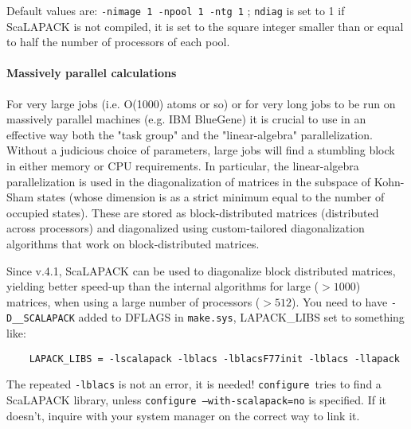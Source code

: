 \documentclass[12pt,a4paper]{article}
\def\configure{\texttt{configure}}
\begin{document}
Default values are: \texttt{-nimage 1 -npool 1 -ntg 1} ; 
\texttt{ndiag} is set to 1 if ScaLAPACK is not compiled,
it is set to the square integer smaller than or equal to  half the number 
of processors of each pool.

\paragraph{Massively parallel calculations}
For very large jobs (i.e. O(1000) atoms or so) or for very long jobs
to be run on massively parallel  machines (e.g. IBM BlueGene) it is
crucial to use in an effective way both the "task group" and the
"linear-algebra" parallelization. Without a judicious choice of
parameters, large jobs will find a stumbling block in either memory or 
CPU requirements. In particular, the linear-algebra parallelization is
used in the diagonalization  of matrices in the subspace of Kohn-Sham
states (whose dimension is as a strict minimum equal to the number of
occupied states). These are stored as block-distributed matrices
(distributed across processors) and diagonalized using custom-tailored
diagonalization algorithms that work on block-distributed matrices.

Since v.4.1, ScaLAPACK can be used to diagonalize block distributed
matrices, yielding better speed-up than the internal algorithms for
large ($ > 1000$) matrices, when using a large number of processors 
($> 512$). You need to have \texttt{-D\_\_SCALAPACK} added to DFLAGS 
in \texttt{make.sys}, LAPACK\_LIBS set to something like:
\begin{verbatim}
    LAPACK_LIBS = -lscalapack -lblacs -lblacsF77init -lblacs -llapack
\end{verbatim}
The repeated \texttt{-lblacs} is not an error, it is needed! 
\configure\ tries to find a ScaLAPACK  library, unless 
\texttt{configure --with-scalapack=no} is specified.
If it doesn't, inquire with your system manager
on the correct way to link it.
\end{document}
